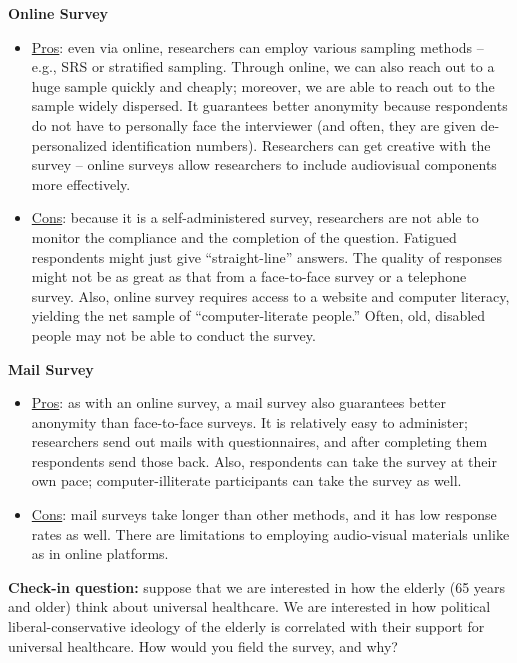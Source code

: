 \documentclass{book}
\begin{document}
\textbf{Online Survey}

\begin{itemize}
\item
  \uline{Pros}: even via online, researchers can employ various sampling
  methods -- e.g., SRS or stratified sampling. Through online, we can also
  reach out to a huge sample quickly and cheaply; moreover, we are able to
  reach out to the sample widely dispersed. It guarantees better anonymity
  because respondents do not have to personally face the interviewer (and
  often, they are given de-personalized identification numbers). Researchers
  can get creative with the survey -- online surveys allow researchers to
  include audiovisual components more effectively.
\item
  \uline{Cons}: because it is a self-administered survey, researchers are not
  able to monitor the compliance and the completion of the question. Fatigued
  respondents might just give ``straight-line'' answers. The quality of
  responses might not be as great as that from a face-to-face survey or a
  telephone survey. Also, online survey requires access to a website and
  computer literacy, yielding the net sample of ``computer-literate people.''
  Often, old, disabled people may not be able to conduct the survey.
\end{itemize}

\textbf{Mail Survey}

\begin{itemize}
\item
  \uline{Pros}: as with an online survey, a mail survey also guarantees better
  anonymity than face-to-face surveys. It is relatively easy to administer;
  researchers send out mails with questionnaires, and after completing them
  respondents send those back. Also, respondents can take the survey at their
  own pace; computer-illiterate participants can take the survey as well.
\item
  \uline{Cons}: mail surveys take longer than other methods, and it has low
  response rates as well. There are limitations to employing audio-visual
  materials unlike as in online platforms.
\end{itemize}

\textbf{Check-in question:} suppose that we are interested in how the elderly
(65 years and older) think about universal healthcare. We are interested in
how political liberal-conservative ideology of the elderly is correlated with
their support for universal healthcare. How would you field the survey, and
why?
\end{document}
